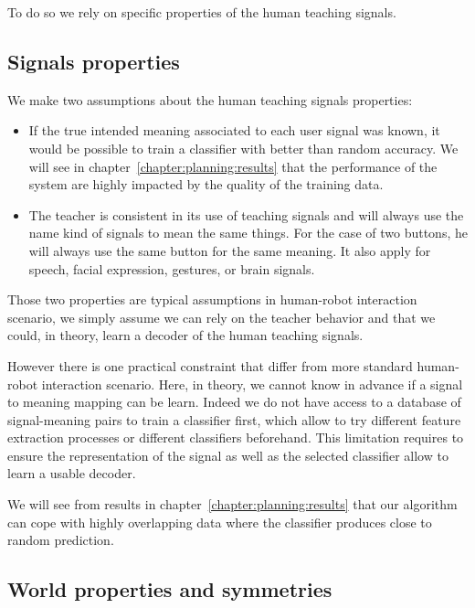 To do so we rely on specific properties of the human teaching signals.

\subsection{Signals properties}
\label{chapter:lfui:signalproperties}

We make two assumptions about the human teaching signals properties:

\begin{itemize}

\item If the true intended meaning associated to each user signal was known, it would be possible to train a classifier with better than random accuracy. We will see in chapter~\ref{chapter:planning:results} that the performance of the system are highly impacted by the quality of the training data.

\item The teacher is consistent in its use of teaching signals and will always use the name kind of signals to mean the same things. For the case of two buttons, he will always use the same button for the same meaning. It also apply for speech, facial expression, gestures, or brain signals. 

\end{itemize}

Those two properties are typical assumptions in human-robot interaction scenario, we simply assume we can rely on the teacher behavior and that we could, in theory, learn a decoder of the human teaching signals.

However there is one practical constraint that differ from more standard human-robot interaction scenario. Here, in theory, we cannot know in advance if a signal to meaning mapping can be learn. Indeed we do not have access to a database of signal-meaning pairs to train a classifier first, which allow to try different feature extraction processes or different classifiers beforehand. This limitation requires to ensure the representation of the signal as well as the selected classifier allow to learn a usable decoder.

We will see from results in chapter~\ref{chapter:planning:results} that our algorithm can cope with highly overlapping data where the classifier produces close to random prediction.

\subsection{World properties and symmetries}
\label{chapter:lfui:symmetries}

